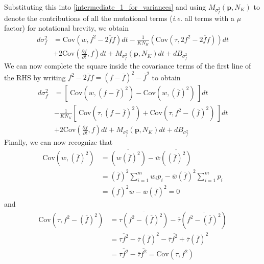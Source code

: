 Substituting this into \eqref{intermediate_1_for_variances} and using $M_{\sigma^2_f}(\mathbf{p},N_K)$ to denote the contributions of all the mutational terms (\emph{i.e.} all terms with a $\mu$ factor) for notational brevity, we obtain
\begin{equation}
\begin{aligned}
d\sigma^2_{f} &= \textrm{Cov}(w,f^2 - 2\overline{f}f)dt - \frac{1}{KN_K}\left(\textrm{Cov}(\tau,2f^2 - 2\overline{f}f)\right)dt\\
&+ 2\textrm{Cov}\left(\frac{\partial f}{\partial t},f\right)dt + M_{\sigma^2_f}(\mathbf{p},N_K)dt + dB_{\sigma^2_{f}}
\end{aligned}
\end{equation}
We can now complete the square inside the covariance terms of the first line of the RHS by writing $f^2 - 2\overline{f}f = (f - \overline{f})^2 - \overline{f}^2$ to obtain
\begin{equation}
\label{intermediate_2_for_variances}
\begin{aligned}
d\sigma^2_{f} &= \left[ \ \textrm{Cov}\left(w,(f - \overline{f})^2\right)-\textrm{Cov}\left(w, {\left(\overline{f}\right)}^2\right) \ \right]dt\\[12pt]
&- \frac{1}{KN_K}\left[ \ \textrm{Cov}\left(\tau,(f - \overline{f})^2\right) + \textrm{Cov}\left(\tau,f^2 - {\left(\overline{f}\right)}^2\right) \ \right]dt\\[12pt]
& + 2\textrm{Cov}\left(\frac{\partial f}{\partial t},f\right)dt + M_{\sigma^2_f}(\mathbf{p},N_K)dt + dB_{\sigma^2_{f}}
\end{aligned}
\end{equation}
Finally, we can now recognize that
\begin{align}
\textrm{Cov}\left(w, {\left(\overline{f}\right)}^2\right) &= \overline{\left(w{\left(\overline{f}\right)}^2\right)} - \overline{w}\overline{\left({\left(\overline{f}\right)}^2\right)}\\
&= {\left(\overline{f}\right)}^2\sum\limits_{i=1}^{m}w_ip_i - \overline{w}{\left(\overline{f}\right)}^2\sum\limits_{i=1}^{m}p_i\\
&= {\left(\overline{f}\right)}^2\overline{w} - \overline{w}{\left(\overline{f}\right)}^2 = 0\label{cov_term_1_for_variances}
\end{align}
and
\begin{align}
\textrm{Cov}\left(\tau,f^2 - {\left(\overline{f}\right)}^2\right) &= \overline{\tau\left(f^2 - {\left(\overline{f}\right)}^2\right)} - \overline{\tau}\left(\overline{f^2 - {\left(\overline{f}\right)}^2}\right)\\
&= \overline{\tau f^2} - \overline{\tau}{\left(\overline{f}\right)}^2  - \overline{\tau}\overline{f^2} + \overline{\tau}{\left(\overline{f}\right)}^2\\
&=\overline{\tau f^2} - \overline{\tau}\overline{f^2} = \textrm{Cov}(\tau,f^2)\label{cov_term_2_for_variances}
\end{align}
